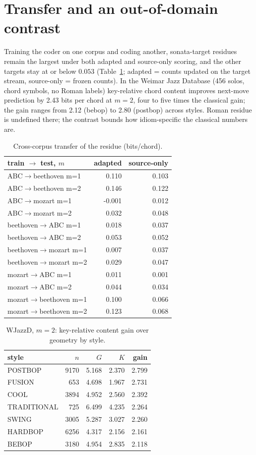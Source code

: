 \documentclass[11pt]{article}
\begin{document}
\section{Transfer and an out-of-domain contrast}
Training the coder on one corpus and coding another, sonata-target residues remain the largest under both adapted and source-only scoring, and the other targets stay at or below $0.053$ (Table~\ref{tab:tr}; adapted = counts updated on the target stream, source-only = frozen counts). In the Weimar Jazz Database (456 solos, chord symbols, no Roman labels) key-relative chord content improves next-move prediction by 2.43 bits per chord at $m=2$, four to five times the classical gain; the gain ranges from 2.12 (bebop) to 2.80 (postbop) across styles. Roman residue is undefined there; the contrast bounds how idiom-specific the classical numbers are.
\begin{table}[t]\centering\small\caption{Cross-corpus transfer of the residue (bits/chord).}\label{tab:tr}
\begin{tabular}{lrr}\toprule train $\rightarrow$ test, $m$ & adapted & source-only \\ \midrule
ABC$\rightarrow$beethoven m=1 & 0.110 & 0.103 \\
ABC$\rightarrow$beethoven m=2 & 0.146 & 0.122 \\
ABC$\rightarrow$mozart m=1 & -0.001 & 0.012 \\
ABC$\rightarrow$mozart m=2 & 0.032 & 0.048 \\
beethoven$\rightarrow$ABC m=1 & 0.018 & 0.037 \\
beethoven$\rightarrow$ABC m=2 & 0.053 & 0.052 \\
beethoven$\rightarrow$mozart m=1 & 0.007 & 0.037 \\
beethoven$\rightarrow$mozart m=2 & 0.029 & 0.047 \\
mozart$\rightarrow$ABC m=1 & 0.011 & 0.001 \\
mozart$\rightarrow$ABC m=2 & 0.044 & 0.034 \\
mozart$\rightarrow$beethoven m=1 & 0.100 & 0.066 \\
mozart$\rightarrow$beethoven m=2 & 0.123 & 0.068 \\
\bottomrule\end{tabular}\end{table}
\begin{table}[t]\centering\small\caption{WJazzD, $m=2$: key-relative content gain over geometry by style.}\label{tab:jz}
\begin{tabular}{lrrrr}\toprule style & $n$ & $G$ & $K$ & gain \\ \midrule
POSTBOP & 9170 & 5.168 & 2.370 & 2.799 \\
FUSION & 653 & 4.698 & 1.967 & 2.731 \\
COOL & 3894 & 4.952 & 2.560 & 2.392 \\
TRADITIONAL & 725 & 6.499 & 4.235 & 2.264 \\
SWING & 3005 & 5.287 & 3.027 & 2.260 \\
HARDBOP & 6256 & 4.317 & 2.156 & 2.161 \\
BEBOP & 3180 & 4.954 & 2.835 & 2.118 \\
\bottomrule\end{tabular}\end{table}
\end{document}
